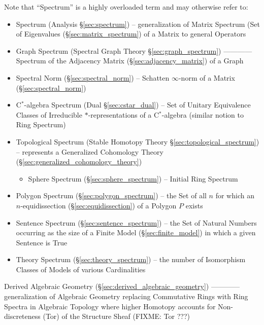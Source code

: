 \fist Note that ``Spectrum'' is a highly overloaded term and may otherwise
refer to:
\begin{itemize}
  \item Spectrum (Analysis \S\ref{sec:spectrum}) -- generalization of Matrix
    Spectrum (Set of Eigenvalues (\S\ref{sec:matrix_spectrum}) of a Matrix to
    general Operators

  \item Graph Spectrum (Spectral Graph Theory \S\ref{sec:graph_spectrum}) ------------
    Spectrum of the Adjacency Matrix (\S\ref{sec:adjacency_matrix}) of a Graph

  \item Spectral Norm (\S\ref{sec:spectral_norm}) -- Schatten $\infty$-norm of
    a Matrix (\S\ref{sec:spectral_norm})

  \item C$^*$-algebra Spectrum (Dual \S\ref{sec:cstar_dual}) -- Set of Unitary
    Equivalence Classes of Irreducible $*$-representations of a C$^*$-algebra
    (similar notion to Ring Spectrum)

  \item Topological Spectrum (Stable Homotopy Theory
    \S\ref{sec:topological_spectrum}) -- represents a Generalized Cohomology
    Theory (\S\ref{sec:generalized_cohomology_theory})
    \begin{itemize}
      \item Sphere Spectrum (\S\ref{sec:sphere_spectrum}) -- Initial Ring
        Spectrum
    \end{itemize}

  \item Polygon Spectrum (\S\ref{sec:polygon_spectrum}) -- the Set of all $n$
    for which an $n$-equidissection (\S\ref{sec:equidissection}) of a Polygon
    $P$ exists

  \item Sentence Spectrum (\S\ref{sec:sentence_spectrum}) -- the Set of Natural
    Numbers occurring as the size of a Finite Model (\S\ref{sec:finite_model})
    in which a given Sentence is True
  \item Theory Spectrum (\S\ref{sec:theory_spectrum}) -- the number of
    Isomorphism Classes of Models of various Cardinalities
\end{itemize}

\fist Derived Algebraic Geometry (\S\ref{sec:derived_algebraic_geometry}) ------------
generalization of Algebraic Geometry replacing Commutative Rings with Ring
Spectra in Algebraic Topology where higher Homotopy accounts for
Non-discreteness (Tor) of the Structure Sheaf (FIXME: Tor ???)

